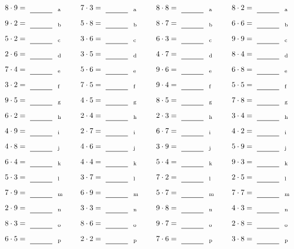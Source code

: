 \documentclass
[
  draft    = true,
  fontsize = 11pt,
  parskip  = half-
]
{scrartcl}
\begin{document}
\par\vfill\par
\begin{align*}
    \pline{8\cdot9}&=\rline{a}
  & \pline{7\cdot3}&=\rline{a}
  & \pline{8\cdot8}&=\rline{a}
  & \pline{8\cdot2}&=\rline{a} \\[1ex]
    \pline{9\cdot2}&=\rline{b}
  & \pline{5\cdot8}&=\rline{b}
  & \pline{8\cdot7}&=\rline{b}
  & \pline{6\cdot6}&=\rline{b} \\[1ex]
    \pline{5\cdot2}&=\rline{c}
  & \pline{3\cdot6}&=\rline{c}
  & \pline{6\cdot3}&=\rline{c}
  & \pline{9\cdot9}&=\rline{c} \\[1ex]
    \pline{2\cdot6}&=\rline{d}
  & \pline{3\cdot5}&=\rline{d}
  & \pline{4\cdot7}&=\rline{d}
  & \pline{8\cdot4}&=\rline{d} \\[1ex]
    \pline{7\cdot4}&=\rline{e}
  & \pline{5\cdot6}&=\rline{e}
  & \pline{9\cdot6}&=\rline{e}
  & \pline{6\cdot8}&=\rline{e} \\[1ex]
    \pline{3\cdot2}&=\rline{f}
  & \pline{7\cdot5}&=\rline{f}
  & \pline{9\cdot4}&=\rline{f}
  & \pline{5\cdot5}&=\rline{f} \\[1ex]
    \pline{9\cdot5}&=\rline{g}
  & \pline{4\cdot5}&=\rline{g}
  & \pline{8\cdot5}&=\rline{g}
  & \pline{7\cdot8}&=\rline{g} \\[1ex]
    \pline{6\cdot2}&=\rline{h}
  & \pline{2\cdot4}&=\rline{h}
  & \pline{2\cdot3}&=\rline{h}
  & \pline{3\cdot4}&=\rline{h} \\[1ex]
    \pline{4\cdot9}&=\rline{i}
  & \pline{2\cdot7}&=\rline{i}
  & \pline{6\cdot7}&=\rline{i}
  & \pline{4\cdot2}&=\rline{i} \\[1ex]
    \pline{4\cdot8}&=\rline{j}
  & \pline{4\cdot6}&=\rline{j}
  & \pline{3\cdot9}&=\rline{j}
  & \pline{5\cdot9}&=\rline{j} \\[1ex]
    \pline{6\cdot4}&=\rline{k}
  & \pline{4\cdot4}&=\rline{k}
  & \pline{5\cdot4}&=\rline{k}
  & \pline{9\cdot3}&=\rline{k} \\[1ex]
    \pline{5\cdot3}&=\rline{l}
  & \pline{3\cdot7}&=\rline{l}
  & \pline{7\cdot2}&=\rline{l}
  & \pline{2\cdot5}&=\rline{l} \\[1ex]
    \pline{7\cdot9}&=\rline{m}
  & \pline{6\cdot9}&=\rline{m}
  & \pline{5\cdot7}&=\rline{m}
  & \pline{7\cdot7}&=\rline{m} \\[1ex]
    \pline{2\cdot9}&=\rline{n}
  & \pline{3\cdot3}&=\rline{n}
  & \pline{9\cdot8}&=\rline{n}
  & \pline{4\cdot3}&=\rline{n} \\[1ex]
    \pline{8\cdot3}&=\rline{o}
  & \pline{8\cdot6}&=\rline{o}
  & \pline{9\cdot7}&=\rline{o}
  & \pline{2\cdot8}&=\rline{o} \\[1ex]
    \pline{6\cdot5}&=\rline{p}
  & \pline{2\cdot2}&=\rline{p}
  & \pline{7\cdot6}&=\rline{p}
  & \pline{3\cdot8}&=\rline{p}
\end{align*}
\end{document}
